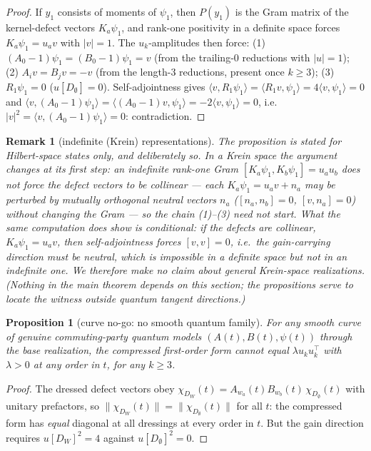 \documentclass[11pt]{article}
\newtheorem{proposition}[theorem]{Proposition}
\newtheorem{remark}[theorem]{Remark}
\newcommand{\la}{\langle}
\newcommand{\ra}{\rangle}
\newcommand{\lam}{\lambda}
\begin{document}
\begin{proof}
If $y_1$ consists of moments of $\psi_1$, then $P(y_1)$ is the Gram matrix
of the kernel-defect vectors $K_a\psi_1$, and rank-one positivity in a
definite space forces $K_a\psi_1=u_a v$ with $|v|=1$. The
$u_k$-amplitudes then force: (1) $(A_0-1)\psi_1=(B_0-1)\psi_1=v$
(from the trailing-$0$ reductions with $|u|=1$); (2) $A_iv=B_jv=-v$ (from
the length-$3$ reductions, present once $k\ge3$); (3) $R_1\psi_1=0$
($u[D_\emptyset]=0$). Self-adjointness gives
$\la v,R_1\psi_1\ra=\la R_1v,\psi_1\ra=4\la v,\psi_1\ra=0$ and
$\la v,(A_0-1)\psi_1\ra=\la(A_0-1)v,\psi_1\ra=-2\la v,\psi_1\ra=0$, i.e.\
$|v|^2=\la v,(A_0-1)\psi_1\ra=0$: contradiction.
\end{proof}

\begin{remark}[indefinite (Krein) representations]\label{rem:krein}
The proposition is stated for Hilbert-space states only, and deliberately
so. In a Krein space the argument changes at its first step: an
indefinite rank-one Gram $[K_a\psi_1,K_b\psi_1]=u_au_b$ does \emph{not}
force the defect vectors to be collinear --- each $K_a\psi_1=u_av+n_a$
may be perturbed by mutually orthogonal \emph{neutral} vectors $n_a$
($[n_a,n_b]=0$, $[v,n_a]=0$) without changing the Gram --- so the chain
(1)--(3) need not start. What the same computation does show is
conditional: \emph{if} the defects are collinear, $K_a\psi_1=u_av$, then
self-adjointness forces $[v,v]=0$, i.e.\ the gain-carrying direction must
be neutral, which is impossible in a definite space but not in an
indefinite one. We therefore make no claim about general Krein-space
realizations. (Nothing in the main theorem depends on this section; the
propositions serve to locate the witness outside quantum tangent
directions.)
\end{remark}

\begin{proposition}[curve no-go: no smooth quantum family]\label{prop:curve}
For any smooth curve of genuine commuting-party quantum models
$(A(t),B(t),\psi(t))$ through the base realization, the compressed
first-order form cannot equal $\lam u_ku_k^\top$ with $\lam>0$ at any
order in $t$, for any $k\ge3$.
\end{proposition}

\begin{proof}
The dressed defect vectors obey
$\chi_{D_W}(t)=A_{w_a}(t)B_{w_b}(t)\,\chi_{D_\emptyset}(t)$ with unitary
prefactors, so $\|\chi_{D_W}(t)\|=\|\chi_{D_\emptyset}(t)\|$ for all $t$:
the compressed form has \emph{equal} diagonal at all dressings at every
order in $t$. But the gain direction requires $u[D_W]^2=4$ against
$u[D_\emptyset]^2=0$.
\end{proof}
\end{document}
